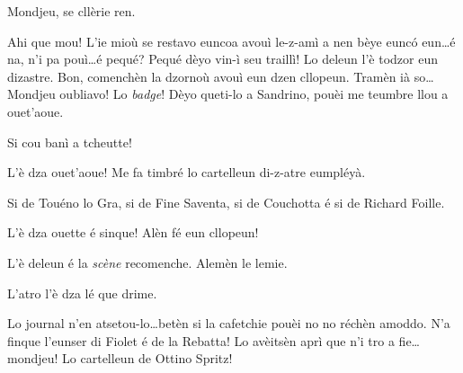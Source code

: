 \begin{drama}
\Spritzspeaks{} Mondjeu,  se cllèrie ren. 

\Spritzspeaks Ahi que mou! L’ie mioù se restavo euncoa avouì le-z-amì a nen bèye eunc\'o eun\ldots é na, n'i pa pouì\ldots é pequé? Pequé dèyo vin-ì seu traillì! Lo deleun l’è todzor eun dizastre. Bon, comenchèn la dzornoù avouì eun dzen cllopeun.  Tramèn ià so\ldots  Mondjeu oubliavo! Lo \textit{badge}! Dèyo queti-lo a Sandrino, pouèi me teumbre llou a ouet'aoue.


\Spritzspeaks Si cou banì a tcheutte!



\Thierryspeaks L'è dza ouet'aoue! Me fa timbré lo cartelleun di-z-atre eumpléyà.


\Thierryspeaks Si de Touéno lo Gra, si de Fine Saventa, si de Couchotta é si de Richard Foille.


\Thierryspeaks L'è dza ouette é sinque! Alèn fé eun cllopeun!


\scene[-- L'è deleun]


\Sandrinospeaks L'è deleun é la \textit{scène} recomenche. Alemèn le lemie.


\Sandrinospeaks{} L'atro l'è dza lé que drime.


\Sandrinospeaks Lo journal n'en atsetou-lo\ldots betèn si la cafetchie pouèi no no réchèn amoddo.  N'a finque l'eunser di Fiolet é de la Rebatta! Lo avèitsèn aprì que n'i tro a fie\ldots mondjeu! Lo cartelleun de Ottino Spritz!


\end{drama}
